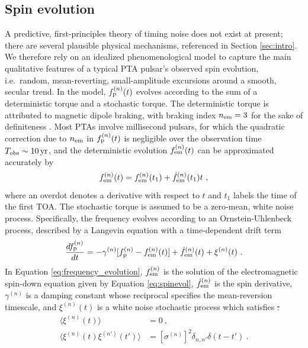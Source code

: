 \documentclass[fleqn,usenatbib,useAMS]{mnras}
\providecommand{\DIFadd}[1]{{\protect\color{blue}\uwave{#1}}} %
\providecommand{\DIFdel}[1]{{\protect\color{red}\sout{#1}}}                      %
\providecommand{\DIFaddbegin}{} %
\providecommand{\DIFaddend}{} %
\providecommand{\DIFdelbegin}{} %
\providecommand{\DIFdelend}{} %
\newcommand{\DIFscaledelfig}{0.5}
\newlength{\DIFdelgraphicswidth} %
\newlength{\DIFdelgraphicsheight} %
\newcommand{\DIFaddincludegraphics}[2][]{{\color{blue}\fbox{\DIFOincludegraphics[#1]{#2}}}} %
\newcommand{\DIFdelincludegraphics}[2][]{%
\sbox{\DIFdelgraphicsbox}{\DIFOincludegraphics[#1]{#2}}%
\settoboxwidth{\DIFdelgraphicswidth}{\DIFdelgraphicsbox} %
\settoboxtotalheight{\DIFdelgraphicsheight}{\DIFdelgraphicsbox} %
\scalebox{\DIFscaledelfig}{%
\parbox[b]{\DIFdelgraphicswidth}{\usebox{\DIFdelgraphicsbox}\\[-\baselineskip] \rule{\DIFdelgraphicswidth}{0em}}\llap{\resizebox{\DIFdelgraphicswidth}{\DIFdelgraphicsheight}{%
\setlength{\unitlength}{\DIFdelgraphicswidth}%
\begin{picture}(1,1)%
\thicklines\linethickness{2pt} %
{\color[rgb]{1,0,0}\put(0,0){\framebox(1,1){}}}%
{\color[rgb]{1,0,0}\put(0,0){\line( 1,1){1}}}%
{\color[rgb]{1,0,0}\put(0,1){\line(1,-1){1}}}%
\end{picture}%
}\hspace*{3pt}}} %
} %
\DeclareRobustCommand{\DIFaddbegin}{\DIFOaddbegin \let\includegraphics\DIFaddincludegraphics} %
\DeclareRobustCommand{\DIFaddend}{\DIFOaddend \let\includegraphics\DIFOincludegraphics} %
\DeclareRobustCommand{\DIFdelbegin}{\DIFOdelbegin \let\includegraphics\DIFdelincludegraphics} %
\DeclareRobustCommand{\DIFdelend}{\DIFOaddend \let\includegraphics\DIFOincludegraphics} %
\begin{document}
\subsection{Spin evolution} \label{sec:psr_frequency}
A predictive, first-principles theory of timing noise does not exist at present; there are several plausible physical mechanisms, referenced in Section \ref{sec:intro}. We therefore rely on an idealized phenomenological model to capture the main qualitative features of a typical PTA pulsar's observed spin evolution, i.e.\ random, mean-reverting, small-amplitude excursions around a smooth, secular trend. In the model, $f_{\rm p}^{(n)}(t)$ evolves according to the sum of a deterministic torque and a stochastic torque. The deterministic torque is attributed to magnetic dipole braking, with braking index $n_{\rm em}=3$ for the sake of definiteness \citep{1969ApJ...157..869G}. Most PTAs involve millisecond pulsars, for which the quadratic correction due to $n_{\rm em}$ in $f_{\rm p}^{(n)}(t)$ is negligible over the observation time $T_{\rm obs} \sim 10 \, {\rm yr}$, and the deterministic evolution $f_{\rm em}^{(n)}(t)$ can be approximated accurately by 
\begin{equation}
 f_{\rm em}^{(n)}(t) = f_{\rm em}^{(n)}(t_1) + \dot{f}_{\rm em}^{(n)}(t_1)t \ , \label{eq:spinevol}
\end{equation} where an overdot denotes a derivative with respect to $t$ and $t_1$ labels the time of the first TOA. The stochastic torque is assumed to be a zero-mean, white noise process. Specifically, the frequency evolves according to an Ornstein-Uhlenbeck process, described by a Langevin equation with a time-dependent drift term \citep{Vargas}\DIFaddbegin \DIFadd{,
}\DIFaddend \begin{equation}
	\frac{df_{\rm p}^{(n)}}{dt} = -\gamma^{(n)}	 [f_{\rm p}^{(n)} - f_{\rm em}^{(n)} (t)] + \dot{f}_{\rm em}^{(n)}(t) +\xi^{(n)}(t) \ . 
	\label{eq:frequency_evolution}
\end{equation}
In Equation \eqref{eq:frequency_evolution}, $f_{\rm em}^{(n)}$ is the solution of the electromagnetic spin-down equation given by Equation \eqref{eq:spinevol}, $\dot{f}_{\rm em}^{(n)}$ is the spin derivative, $\gamma^{(n)}$ is a damping constant whose reciprocal specifies the mean-reversion timescale, and $\xi^{(n)}(t)$ is a white noise stochastic process which satisfies
\DIFdelbegin \DIFdel{:
}\DIFdelend \begin{align}
	\langle \xi^{(n)}(t) \rangle &= 0 \ , \\
	\langle \xi^{(n)}(t) \xi^{(n')}(t') \rangle &= [\sigma^{(n)}]^2 \delta_{n,n'} \delta (t - t') \ .	\label{eq:xieqn}
\end{align}
\end{document}
